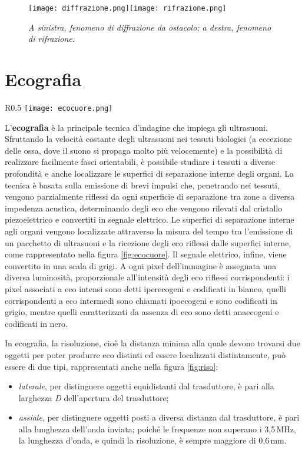 \documentclass{report}
\newcommand{\figref}[1]{figura \ref{#1}}
\numberwithin{equation}{section}
\numberwithin{figure}{section}
\begin{document}
\begin{figure}[htp]
\centering
\texttt{[image: diffrazione.png]}\quad\texttt{[image: rifrazione.png]}
\caption{\label{fig:rifrazione} \textit{A sinistra, fenomeno di diffrazione da ostacolo; a destra, fenomeno di rifrazione}.}
\end{figure}

\section{Ecografia}

\begin{wrapfigure}{R}{0.5\textwidth}
    \centering
    \texttt{[image: ecocuore.png]}
    \caption{\textit{Schematizzazione di ecografia al cuore, con segnale relativo alle interfacce interne dell'organo}.}
    \label{fig:ecocuore}
\end{wrapfigure}

L'\textbf{ecografia} è la principale tecnica d'indagine che impiega gli ultrasuoni. Sfruttando la velocità costante degli ultrasuoni nei tessuti biologici (a eccezione delle ossa, dove il suono si propaga molto più velocemente) e la possibilità di realizzare facilmente fasci orientabili, è possibile studiare i tessuti a diverse profondità e anche localizzare le superfici di separazione interne degli organi. La tecnica è basata sulla emissione di brevi impulsi che, penetrando nei tessuti, vengono parzialmente riflessi da ogni superficie di separazione tra zone a diversa impedenza acustica, determinando degli eco che vengono rilevati dal cristallo piezoelettrico e convertiti in segnale elettrico. Le superfici di separazione interne agli organi vengono localizzate attraverso la misura del tempo tra l’emissione di un pacchetto di ultrasuoni e la ricezione degli eco riflessi dalle superfici interne, come rappresentato nella \figref{fig:ecocuore}. Il segnale elettrico, infine, viene convertito in una scala di grigi. A ogni pixel dell'immagine è assegnata una diversa luminosità, proporzionale all'intensità degli eco riflessi corrispondenti: i pixel associati a eco intensi sono detti iperecogeni e codificati in bianco, quelli corrispondenti a eco intermedi sono chiamati ipoecogeni e sono codificati in grigio, mentre quelli caratterizzati da assenza di eco sono detti anaecogeni e codificati in nero.

In ecografia, la risoluzione, cioè la distanza minima alla quale devono trovarsi due oggetti per poter produrre eco distinti ed essere localizzati distintamente, può essere di due tipi, rappresentati anche nella \figref{fig:riso}:
\begin{itemize}[label=$-$]
    \item \emph{laterale}, per distinguere oggetti equidistanti dal trasduttore, è pari alla larghezza \textit{D} dell'apertura del trasduttore;
    \item \emph{assiale}, per distinguere oggetti posti a diversa distanza dal trasduttore, è pari alla lunghezza dell'onda inviata; poiché le frequenze non superano i 3,5\,MHz, la lunghezza d'onda, e quindi la risoluzione, è sempre maggiore di 0,6\,mm.
\end{itemize}
\end{document}
